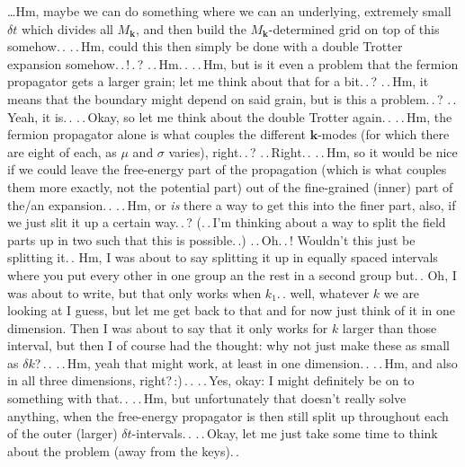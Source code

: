 \documentclass{report}
\begin{document}
\ldots Hm, maybe we can do something where we can an underlying, extremely small $\delta t$ which divides all $M_{\boldsymbol{k}}$, and then build the $M_{\boldsymbol{k}}$-determined grid on top of this somehow.\,. .\,.\,Hm, could this then simply be done with a double Trotter expansion somehow.\,.\,!\,.\,? %
.\,.\,Hm.\,. .\,.\,Hm, but is it even a problem that the fermion propagator gets a larger grain; let me think about that for a bit.\,.\,? .\,.\,Hm, it means that the boundary might depend on said grain, but is this a problem.\,.\,? .\,.\,Yeah, it is.\,. .\,.\,Okay, so let me think about the double Trotter again.\,. .\,.\,Hm, the fermion propagator alone is what couples the different $\boldsymbol{k}$-modes (for which there are eight of each, as $\mu$ and $\sigma$ varies), right.\,.\,? %
.\,.\,Right.\,. .\,.\,Hm, so it would be nice if we could leave the free-energy part of the propagation (which is what couples them more exactly, not the potential part) out of the fine-grained (inner) part of the/an expansion.\,. .\,.\,Hm, or \emph{is} there a way to get this into the finer part, also, if we just slit it up a certain way.\,.\,? (.\,.\,I'm thinking about a way to split the field parts up in two such that this is possible.\,.) .\,.\,Oh.\,.\,! Wouldn't this just be splitting it.\,. Hm, I was about to say splitting it up in equally spaced intervals where you put every other in one group an the rest in a second group but.\,. Oh, I was about to write, but that only works when $k_1$.\,. well, whatever $k$ we are looking at I guess, but let me get back to that and for now just think of it in one dimension. Then I was about to say that it only works for $k$ larger than those interval, but then I of course had the thought: why not just make these as small as $\delta k$?\,.\,. .\,.\,Hm, yeah that might work, at least in one dimension.\,. .\,.\,Hm, and also in all three dimensions, right?\,:)\,.\,. %
.\,.\,Yes, okay: I might definitely be on to something with that.\,. .\,.\,Hm, but unfortunately that doesn't really solve anything, when the free-energy propagator is then still split up throughout each of the outer (larger) $\delta t$-intervals.\,. .\,.\,Okay, let me just take some time to think about the problem (away from the keys).\,. %
\end{document}
